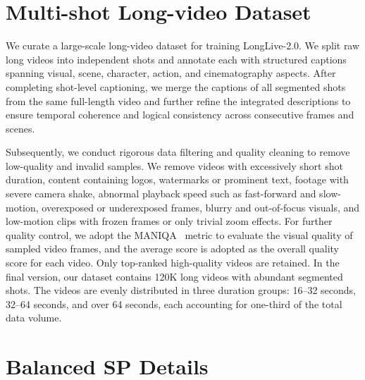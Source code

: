 \documentclass{llmxive}
\begin{document}
\section{Multi-shot Long-video Dataset}
We curate a large-scale long-video dataset for training LongLive-2.0. We split raw long videos into independent shots and annotate each with structured captions spanning visual, scene, character, action, and cinematography aspects. After completing shot-level captioning, we merge the captions of all segmented shots from the same full-length video and further refine the integrated descriptions to ensure temporal coherence and logical consistency across consecutive frames and scenes.

Subsequently, we conduct rigorous data filtering and quality cleaning to remove low-quality and invalid samples. We remove videos with excessively short shot duration, content containing logos, watermarks or prominent text, footage with severe camera shake, abnormal playback speed such as fast-forward and slow-motion, overexposed or underexposed frames, blurry and out-of-focus visuals, and low-motion clips with frozen frames or only trivial zoom effects. For further quality control, we adopt the MANIQA~\cite{maniqa} metric to evaluate the visual quality of sampled video frames, and the average score is adopted as the overall quality score for each video. Only top-ranked high-quality videos are retained. In the final version, our dataset contains 120K long videos with abundant segmented shots. The videos are evenly distributed in three duration groups: 16–32 seconds, 32–64 seconds, and over 64 seconds, each accounting for one-third of the total data volume.


\section{Balanced SP Details}\label{ap:balanced_sp}
\end{document}
